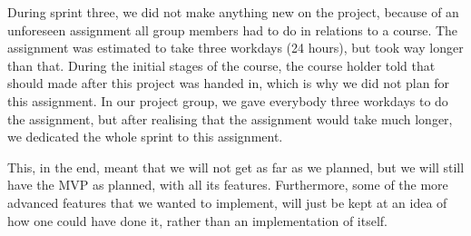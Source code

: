 During sprint three, we did not make anything new on the project, because of an unforeseen assignment all group members had to do in relations to a course.
The assignment was estimated to take three workdays (24 hours), but took way longer than that.
During the initial stages of the course, the course holder told that should made after this project was handed in, which is why we did not plan for this assignment.
In our project group, we gave everybody three workdays to do the assignment, but after realising that the assignment would take much longer, we dedicated the whole sprint to this assignment.

This, in the end, meant that we will not get as far as we planned, but we will still have the MVP as planned, with all its features.
Furthermore, some of the more advanced features that we wanted to implement, will just be kept at an idea of how one could have done it, rather than an implementation of itself.
